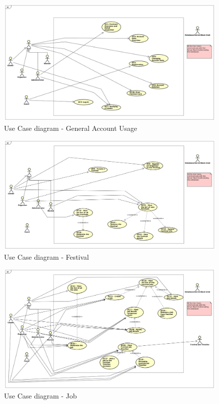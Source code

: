 				\begin{figure}[H]
					\includegraphics[width=\linewidth]{diagrams/uc-diag0-general.png}
					\caption{Use Case diagram - General Account Usage}
					\label{fig:uc_diag_0_general}
				\end{figure}
			
				\begin{figure}[H]
					\includegraphics[width=\linewidth]{diagrams/uc-diag1-festival.png}
					\caption{Use Case diagram - Festival}
					\label{fig:uc_diag_1_festival}
				\end{figure}
		
				\begin{figure}[H]
					\includegraphics[width=\linewidth]{diagrams/uc-diag2-job.png}
					\caption{Use Case diagram - Job}
					\label{fig:uc_diag_2_job}
				\end{figure}
	
